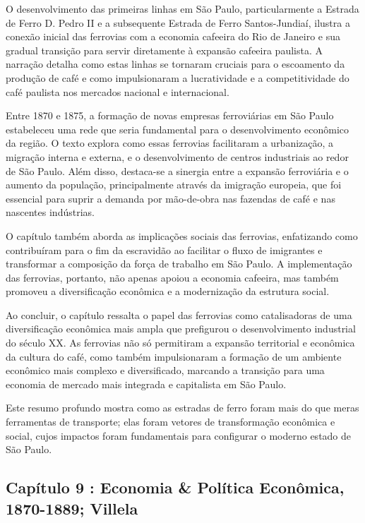 \documentclass[a4paper,12pt]{article}[abntex2]
\begin{document}
O desenvolvimento das primeiras linhas em São Paulo, particularmente a Estrada de Ferro D. Pedro II e a subsequente Estrada de Ferro Santos-Jundiaí, ilustra a conexão inicial das ferrovias com a economia cafeeira do Rio de Janeiro e sua gradual transição para servir diretamente à expansão cafeeira paulista. A narração detalha como estas linhas se tornaram cruciais para o escoamento da produção de café e como impulsionaram a lucratividade e a competitividade do café paulista nos mercados nacional e internacional.

Entre 1870 e 1875, a formação de novas empresas ferroviárias em São Paulo estabeleceu uma rede que seria fundamental para o desenvolvimento econômico da região. O texto explora como essas ferrovias facilitaram a urbanização, a migração interna e externa, e o desenvolvimento de centros industriais ao redor de São Paulo. Além disso, destaca-se a sinergia entre a expansão ferroviária e o aumento da população, principalmente através da imigração europeia, que foi essencial para suprir a demanda por mão-de-obra nas fazendas de café e nas nascentes indústrias.

O capítulo também aborda as implicações sociais das ferrovias, enfatizando como contribuíram para o fim da escravidão ao facilitar o fluxo de imigrantes e transformar a composição da força de trabalho em São Paulo. A implementação das ferrovias, portanto, não apenas apoiou a economia cafeeira, mas também promoveu a diversificação econômica e a modernização da estrutura social.

Ao concluir, o capítulo ressalta o papel das ferrovias como catalisadoras de uma diversificação econômica mais ampla que prefigurou o desenvolvimento industrial do século XX. As ferrovias não só permitiram a expansão territorial e econômica da cultura do café, como também impulsionaram a formação de um ambiente econômico mais complexo e diversificado, marcando a transição para uma economia de mercado mais integrada e capitalista em São Paulo.

Este resumo profundo mostra como as estradas de ferro foram mais do que meras ferramentas de transporte; elas foram vetores de transformação econômica e social, cujos impactos foram fundamentais para configurar o moderno estado de São Paulo.

\newpage

\subsection{\textbf{Capítulo 9 : Economia \& Política Econômica, 1870-1889}; Villela}
\end{document}
